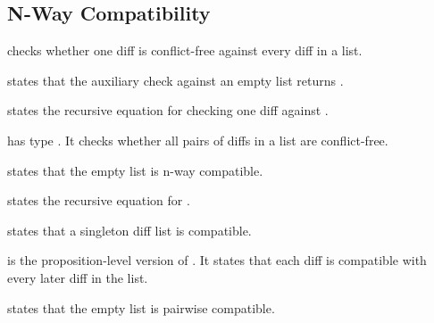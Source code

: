 \subsection{N-Way Compatibility}

\begin{definition}
 checks whether one diff is conflict-free against
every diff in a list.
\end{definition}

\begin{theorem}
 states that the auxiliary check against an empty
list returns .
\end{theorem}

\begin{theorem}
 states the recursive equation for checking one
diff against .
\end{theorem}

\begin{definition}[nWayCompatible]
\code{[nWayCompatible]} has type . It checks whether
all pairs of diffs in a list are conflict-free.
\end{definition}

\begin{theorem}
 states that the empty list is n-way compatible.
\end{theorem}

\begin{theorem}
 states the recursive equation for
.
\end{theorem}

\begin{theorem}
 states that a singleton diff list is
compatible.
\end{theorem}

\begin{definition}[PairwiseCompatible]
\code{[PairwiseCompatible]} is the proposition-level version of
. It states that each diff is compatible with every later
diff in the list.
\end{definition}

\begin{theorem}
 states that the empty list is pairwise
compatible.
\end{theorem}

